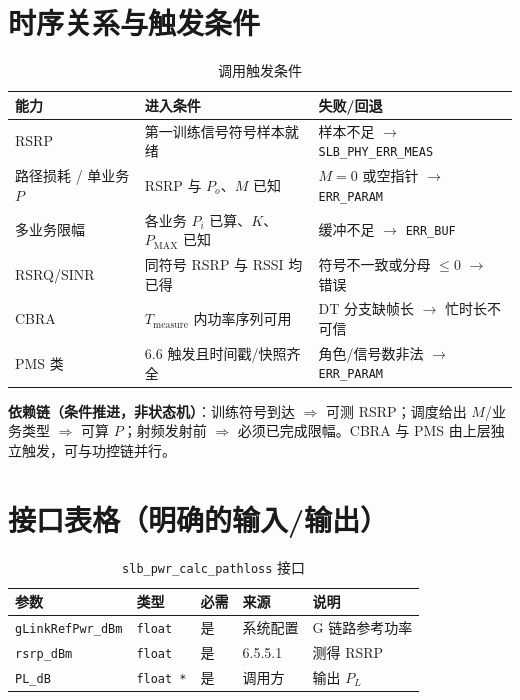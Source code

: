 \documentclass[11pt,a4paper]{ctexart}
\begin{document}
\section{时序关系与触发条件}

\begin{longtable}{L{3.5cm}L{5.5cm}L{5.5cm}}
\caption{调用触发条件\label{tab:6545-trig}} \\
\toprule
\textbf{能力} & \textbf{进入条件} & \textbf{失败/回退} \\
\midrule
RSRP & 第一训练信号符号样本就绪 & 样本不足 $\rightarrow$ \texttt{SLB\_PHY\_ERR\_MEAS} \\
路径损耗 / 单业务 $P$ & RSRP 与 $P_o$、$M$ 已知 & $M{=}0$ 或空指针 $\rightarrow$ \texttt{ERR\_PARAM} \\
多业务限幅 & 各业务 $P_i$ 已算、$K$、$P_{\mathrm{MAX}}$ 已知 & 缓冲不足 $\rightarrow$ \texttt{ERR\_BUF} \\
RSRQ/SINR & 同符号 RSRP 与 RSSI 均已得 & 符号不一致或分母 $\leq 0$ $\rightarrow$ 错误 \\
CBRA & $T_{\mathrm{measure}}$ 内功率序列可用 & DT 分支缺帧长 $\rightarrow$ 忙时长不可信 \\
PMS 类 & 6.6 触发且时间戳/快照齐全 & 角色/信号数非法 $\rightarrow$ \texttt{ERR\_PARAM} \\
\bottomrule
\end{longtable}

\textbf{依赖链（条件推进，非状态机）}：训练符号到达 $\Rightarrow$ 可测 RSRP；调度给出 $M$/业务类型 $\Rightarrow$ 可算 $P$；射频发射前 $\Rightarrow$ 必须已完成限幅。CBRA 与 PMS 由上层独立触发，可与功控链并行。

\section{接口表格（明确的输入/输出）}

\begin{longtable}{L{3.2cm}L{2.5cm}L{1.2cm}L{1.5cm}L{5.5cm}}
\caption{\texttt{slb\_pwr\_calc\_pathloss} 接口\label{tab:6545-if-pl}} \\
\toprule
\textbf{参数} & \textbf{类型} & \textbf{必需} & \textbf{来源} & \textbf{说明} \\
\midrule
\texttt{gLinkRefPwr\_dBm} & \texttt{float} & 是 & 系统配置 & G 链路参考功率 \\
\texttt{rsrp\_dBm} & \texttt{float} & 是 & 6.5.5.1 & 测得 RSRP \\
\texttt{PL\_dB} & \texttt{float *} & 是 & 调用方 & 输出 $P_L$ \\
\bottomrule
\end{longtable}
\end{document}
